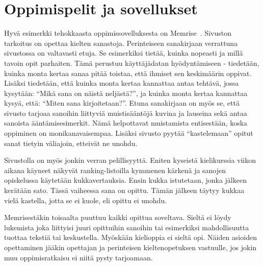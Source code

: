 \documentclass[utf8,bachelor]{gradu3}
\begin{document}





\section{Oppimispelit ja sovellukset}

Hyvä esimerkki tehokkaasta oppimissovelluksesta on Memrise~\parencite[][]{memrise}. Sivuston tarkoitus on opettaa kielten sanastoja. Perinteiseen sanakirjaan verrattuna sivustossa on valtavasti etuja. Se esimerkiksi tietää, kuinka nopeasti ja millä tavoin opit parhaiten. Tämä perustuu käyttäjädatan hyödyntämiseen - tiedetään, kuinka monta kertaa sanaa pitää toistaa, että ihmiset sen keskimäärin oppivat. Lisäksi tiedetään, että kuinka monta kertaa kannattaa antaa tehtävä, jossa kysytään: “Mikä sana on näistä neljästä?”, ja kuinka monta kertaa kannattaa kysyä, että: “Miten sana kirjoitetaan?”. Etuna sanakirjaan on myös se, että sivusto tarjoaa sanoihin liittyviä muistisääntöjä kuvina ja lauseina sekä antaa sanoista ääntämisesimerkit. Nämä helpottavat muistamista entisestään, koska oppiminen on monikanavaisempaa. Lisäksi sivusto pyytää “kastelemaan” opitut sanat tietyin väliajoin, etteivät ne unohdu.

Sivustolla on myös jonkin verran pelillisyyttä. Eniten kyseistä kielikurssia viikon aikana käyneet näkyvät ranking-listoilla kymmenen kärkenä ja sanojen opiskelussa käytetään kukkavertauksia. Ensin kukka istutetaan, jonka jälkeen kerätään sato. Tässä vaiheessa sana on opittu. Tämän jälkeen täytyy kukkaa vielä kastella, jotta se ei kuole, eli opittu ei unohdu. 

Memrisestäkin toisaalta puuttuu kaikki opittua soveltava. Sieltä ei löydy lukemista joka liittyisi juuri opittuihin sanoihin tai esimerkiksi mahdollisuutta tuottaa tekstiä tai keskustella. Myöskään kielioppia ei sieltä opi. Näiden asioiden opettaminen jääkin opettajan ja perinteisen kieltenopetuksen vastuulle, jos jokin muu oppimisratkaisu ei niitä pysty tarjoamaan.
\end{document}
